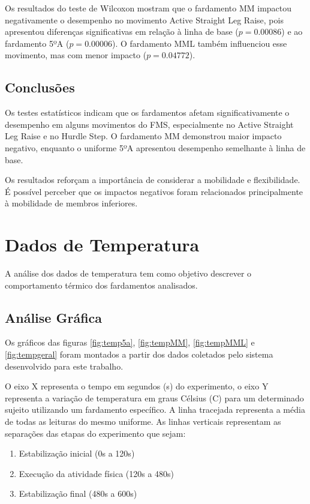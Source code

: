 Os resultados do teste de Wilcoxon mostram que o fardamento \acrlong{MM} impactou negativamente o desempenho no movimento Active Straight Leg Raise, pois apresentou diferenças significativas em relação à linha de base ($p = 0.00086$) e ao fardamento 5ºA ($p = 0.00006$). O fardamento \acrlong{MML} também influenciou esse movimento, mas com menor impacto ($p = 0.04772$).

\subsection{Conclusões}
Os testes estatísticos indicam que os fardamentos afetam significativamente o desempenho em alguns movimentos do \acrshort{FMS}, especialmente no Active Straight Leg Raise e no Hurdle Step. O fardamento \acrlong{MM} demonstrou maior impacto negativo, enquanto o uniforme 5ºA apresentou desempenho semelhante à linha de base.

\tab Os resultados reforçam a importância de considerar a mobilidade e flexibilidade. É possível perceber que os impactos negativos foram relacionados principalmente à mobilidade de membros inferiores.

\section{Dados de Temperatura}


A análise dos dados de temperatura tem como objetivo descrever o comportamento térmico dos fardamentos analisados.

\subsection{Análise Gráfica}
Os gráficos das figuras \ref{fig:temp5a}, \ref{fig:tempMM}, \ref{fig:tempMML} e \ref{fig:tempgeral} foram montados
a partir dos dados coletados pelo sistema desenvolvido para este trabalho. 

O eixo X representa o tempo em segundos (s) do experimento, o eixo Y representa a variação de temperatura em graus Célsius (\degree C) para um 
determinado sujeito utilizando um fardamento específico. A linha tracejada representa a 
média de todas as leituras do mesmo uniforme. As linhas verticais representam as separações das etapas
do experimento que sejam: 
\begin{enumerate}[label=\Roman*.] %
    \item Estabilização inicial (0s a 120s)
    \item Execução da atividade física (120s a 480s)
    \item Estabilização final (480s a 600s)
\end{enumerate}
 

